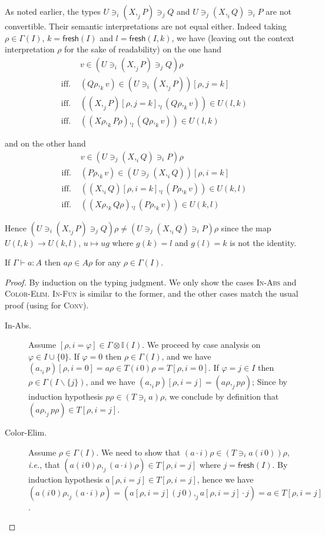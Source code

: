 \documentclass[english]{PaperTools/latex/lipics}
\newcommand\op[1]{∋_{#1}}
\def\fresh#1{\mathsf{fresh}(#1)}
\def\ie{\textit{i.e.}}
\begin{document}
\begin{remark}
  As noted earlier, the types
  $U \op i (X ,_j P) \op j Q$ and $U \op j (X ,_i Q) \op i P$
  are not convertible.
  Their semantic interpretations are not equal either.  Indeed
  taking $ρ ∈ Γ(I)$, $k = \fresh{I}$ and $l = \fresh{I,k}$,
  we have
  (leaving out the context interpretation $ρ$ for the sake of
  readability)
  on the one hand
  \begin{align*}
    &v ∈ (U \op i (X ,_j P) \op j Q) ρ
    \\
    \text{ iff. }& (Qρ ,_k v) ∈ (U \op i (X ,_j P))[ρ,j=k]
    \\
    \text{ iff. }& ((X ,_j P)[ρ,j=k] ,_l (Qρ ,_k v)) ∈ U(l,k)
    \\
    \text{ iff. }& ((Xρ ,_k Pρ) ,_l (Qρ ,_k v)) ∈ U(l,k)
  \end{align*}

  and on the other hand
  \begin{align*}
    &v ∈ (U \op j (X ,_i Q) \op i P) ρ
    \\
    \text{ iff. }& (Pρ ,_k v) ∈ (U \op j (X ,_i Q))[ρ,i=k]
    \\
    \text{ iff. }& ((X ,_i Q)[ρ,i=k] ,_l (Pρ ,_k v)) ∈ U(k,l)
    \\
    \text{ iff. }& ((Xρ ,_k Qρ) ,_l (Pρ ,_k v)) ∈ U(k,l)
  \end{align*}

  Hence $(U \op i (X ,_j P) \op j Q) ρ ≠ (U \op j (X ,_i Q) \op i P) ρ$
  since the map $U(l,k) → U(k,l)$, $u ↦ ug$ where $g(k) = l$ and $g(l)=k$
  is not the identity.
\end{remark}


\begin{theorem}[Validity]
  If $Γ ⊢ a : A$ then $aρ ∈ Aρ$ for any $ρ ∈ Γ(I)$.
\end{theorem}
\begin{proof}
  By induction on the typing judgment.  We only show the cases \textsc{In-Abs} and \textsc{Color-Elim}.  \textsc{In-Fun} is similar to the former, and the other
  cases match the usual proof (using  for \textsc{Conv}).
  \begin{description}
    \item[\sc In-Abs.]
      Assume $[ρ,i=φ] ∈ Γ⊗𝕀(I)$.  We proceed by case analysis on $φ ∈ I ∪ \{0\}$.
      If $φ = 0$ then $ρ ∈ Γ(I)$, and we have
      $(a ,_i p)[ρ,i=0] = aρ ∈ T(i\,0)ρ = T[ρ,i=0]$.
      If $φ = j ∈ I$ then $ρ ∈ Γ(I\backslash\{j\})$, and we have
      $(a ,_i p)[ρ,i=j] = (aρ ,_j pρ)$;
      Since by induction hypothesis $pρ ∈ (T \op {i} a)ρ$, we conclude
      by definition that $(aρ ,_j pρ) ∈ T[ρ,i=j]$.

    \item[\sc Color-Elim.]
      Assume $ρ ∈ Γ(I)$.
      We need to show that $(a·i)ρ ∈ (T \op i {a(i\,0)})ρ$, \ie, that
      $ (a(i\,0)ρ ,_j (a·i)ρ) ∈ T[ρ,i=j]$ where $j = \fresh I$.
      By induction hypothesis $a[ρ,i=j] ∈ T[ρ,i=j]$, hence
      we have
      $(a(i\,0)ρ ,_j (a·i)ρ) = (a[ρ,i=j](j\,0) ,_j a[ρ,i=j]·j) = a ∈ T[ρ,i=j]$.
    \qedhere
  \end{description}

\end{proof}
\end{document}
